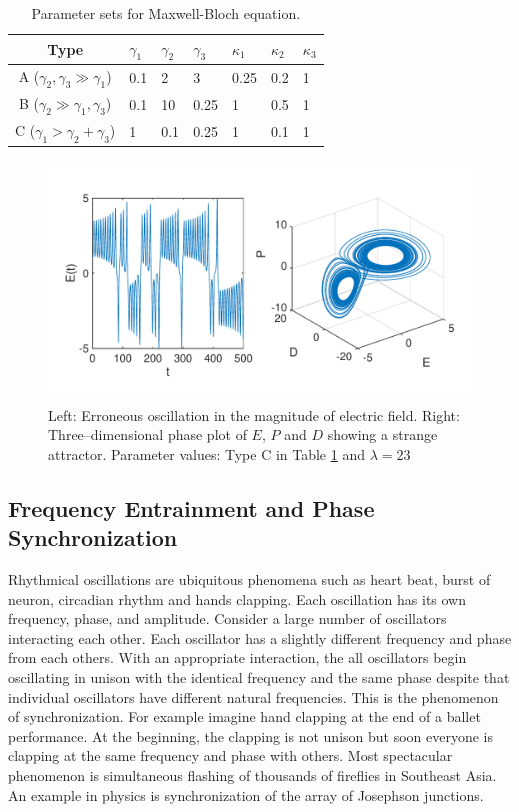  
\begin{table}[t]
\begin{center}
\footnotesize
\begin{tabular}{c|llllll}
\hline
Type & $\gamma_1$ & $\gamma_2$ & $\gamma_3$ & $\kappa_1$ & $\kappa_2$ & $\kappa_3$ \\
\hline
A ($\gamma_2, \gamma_3 \gg \gamma_1$) & 0.1 & 2 & 3 & 0.25 & 0.2 & 1\\
B ($\gamma_2 \gg \gamma_1, \gamma_3$) & 0.1 & 10 & 0.25 & 1 & 0.5 & 1\\
C ($\gamma_1 > \gamma_2 + \gamma_3$)  & 1 & 0.1 & 0.25 & 1 & 0.1 & 1\\
\hline
\end{tabular}
\end{center}
\caption{Parameter sets for Maxwell-Bloch equation.}\label{tbl:maxwell_bloch}
\end{table}

\begin{figure}
\center
\includegraphics[height=2.5in]{05.ode1/maxwell_bloch.pdf}
\caption{Left: Erroneous oscillation in the magnitude of electric field. Right: Three--dimensional phase plot of $E$, $P$ and $D$ showing a strange attractor.  Parameter values: Type C in Table \ref{tbl:maxwell_bloch} and $\lambda=23$}
\label{fig:maxwell_bloch}
\end{figure}

\subsection{Frequency Entrainment and Phase Synchronization}

Rhythmical oscillations are ubiquitous phenomena such as heart beat, burst of neuron, circadian rhythm and hands clapping.  Each oscillation has its own frequency, phase, and amplitude.  Consider a large number of oscillators interacting each other.  Each oscillator has a slightly different frequency and phase from each others. With an appropriate interaction, the all oscillators begin  oscillating in unison with the identical frequency and the same phase despite that individual oscillators have different natural frequencies. This is the phenomenon of synchronization.\cite{sync} For example imagine hand clapping at the end of a ballet performance.  At the beginning, the clapping is not unison but soon everyone is clapping at the same frequency and phase with others.  Most spectacular phenomenon is simultaneous flashing of thousands of fireflies in Southeast Asia.\cite{sync,fireflies}  An example in physics is synchronization of the array of Josephson junctions.\cite{sync}

